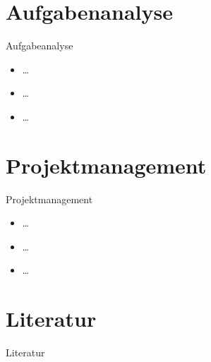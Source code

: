 \documentclass[presentation,bigger,aspectratio=169]{beamer}
\begin{document}
\section{Aufgabenanalyse}
\label{sec:org6c4df16}
\begin{frame}[label={sec:org499e4ee}]{\MakeUppercase{\insertsection}}
\end{frame}
\begin{frame}[label={sec:org6ce7319}]{Aufgabeanalyse}
\begin{itemize}
\item \ldots{}
\item \ldots{}
\item \ldots{}
\end{itemize}
\end{frame}
\section{Projektmanagement}
\label{sec:org3ee0bd0}
\begin{frame}[label={sec:orge390012}]{\MakeUppercase{\insertsection}}
\end{frame}
\begin{frame}[label={sec:orgee21365}]{Projektmanagement}
\begin{itemize}
\item \ldots{}
\item \ldots{}
\item \ldots{}
\end{itemize}
\end{frame}
\section*{Literatur}
\label{sec:orgedd23cf}
\begin{frame}[allowframebreaks]{Literatur}
\printbibliography[heading=none]
\end{frame}
\appendix
\end{document}
